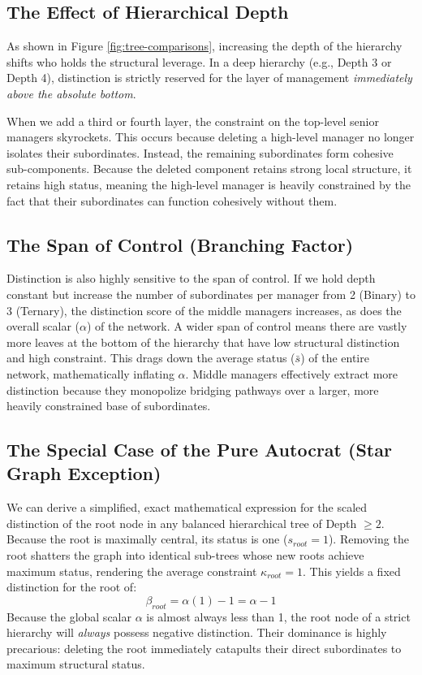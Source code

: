 \subsection*{The Effect of Hierarchical Depth}
As shown in Figure \ref{fig:tree-comparisons}, increasing the depth of the hierarchy shifts who holds the structural leverage. In a deep hierarchy (e.g., Depth 3 or Depth 4), distinction is strictly reserved for the layer of management \textit{immediately above the absolute bottom}. 

When we add a third or fourth layer, the constraint on the top-level senior managers skyrockets. This occurs because deleting a high-level manager no longer isolates their subordinates. Instead, the remaining subordinates form cohesive sub-components. Because the deleted component retains strong local structure, it retains high status, meaning the high-level manager is heavily constrained by the fact that their subordinates can function cohesively without them.

\subsection*{The Span of Control (Branching Factor)}
Distinction is also highly sensitive to the span of control. If we hold depth constant but increase the number of subordinates per manager from 2 (Binary) to 3 (Ternary), the distinction score of the middle managers increases, as does the overall scalar ($\alpha$) of the network. A wider span of control means there are vastly more leaves at the bottom of the hierarchy that have low structural distinction and high constraint. This drags down the average status ($\bar{s}$) of the entire network, mathematically inflating $\alpha$. Middle managers effectively extract more distinction because they monopolize bridging pathways over a larger, more heavily constrained base of subordinates.

\subsection*{The Special Case of the Pure Autocrat (Star Graph Exception)}
We can derive a simplified, exact mathematical expression for the scaled distinction of the root node in any balanced hierarchical tree of Depth $\ge 2$. Because the root is maximally central, its status is one ($s_{root} = 1$). Removing the root shatters the graph into identical sub-trees whose new roots achieve maximum status, rendering the average constraint $\kappa_{root} = 1$. This yields a fixed distinction for the root of:
\begin{equation}
    \beta_{root} = \alpha(1) - 1 = \alpha - 1
\end{equation}
Because the global scalar $\alpha$ is almost always less than 1, the root node of a strict hierarchy will \textit{always} possess negative distinction. Their dominance is highly precarious: deleting the root immediately catapults their direct subordinates to maximum structural status.

